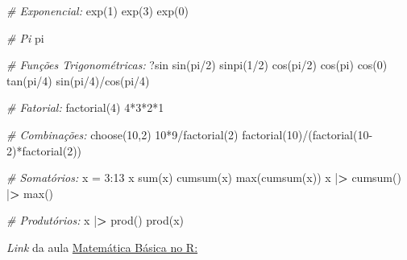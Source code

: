 \documentclass[
  brazilian,
]{book}
\newenvironment{Shaded}{\begin{snugshade}}{\end{snugshade}}
\newcommand{\CommentTok}[1]{\textcolor[rgb]{0.56,0.35,0.01}{\textit{#1}}}
\newcommand{\DecValTok}[1]{\textcolor[rgb]{0.00,0.00,0.81}{#1}}
\newcommand{\ErrorTok}[1]{\textcolor[rgb]{0.64,0.00,0.00}{\textbf{#1}}}
\newcommand{\FunctionTok}[1]{\textcolor[rgb]{0.00,0.00,0.00}{#1}}
\newcommand{\NormalTok}[1]{#1}
\newcommand{\OtherTok}[1]{\textcolor[rgb]{0.56,0.35,0.01}{#1}}
\newcommand{\SpecialCharTok}[1]{\textcolor[rgb]{0.00,0.00,0.00}{#1}}
\begin{document}
\begin{Shaded}
\begin{Highlighting}[]
\CommentTok{\# Exponencial:}
\FunctionTok{exp}\NormalTok{(}\DecValTok{1}\NormalTok{)}
\FunctionTok{exp}\NormalTok{(}\DecValTok{3}\NormalTok{)}
\FunctionTok{exp}\NormalTok{(}\DecValTok{0}\NormalTok{)}

\CommentTok{\# Pi}
\NormalTok{pi}

\CommentTok{\# Funções Trigonométricas:}
\NormalTok{?sin}
\FunctionTok{sin}\NormalTok{(pi}\SpecialCharTok{/}\DecValTok{2}\NormalTok{)}
\FunctionTok{sinpi}\NormalTok{(}\DecValTok{1}\SpecialCharTok{/}\DecValTok{2}\NormalTok{)}
\FunctionTok{cos}\NormalTok{(pi}\SpecialCharTok{/}\DecValTok{2}\NormalTok{)}
\FunctionTok{cos}\NormalTok{(pi)}
\FunctionTok{cos}\NormalTok{(}\DecValTok{0}\NormalTok{)}
\FunctionTok{tan}\NormalTok{(pi}\SpecialCharTok{/}\DecValTok{4}\NormalTok{)}
\FunctionTok{sin}\NormalTok{(pi}\SpecialCharTok{/}\DecValTok{4}\NormalTok{)}\SpecialCharTok{/}\FunctionTok{cos}\NormalTok{(pi}\SpecialCharTok{/}\DecValTok{4}\NormalTok{)}

\CommentTok{\# Fatorial:}
\FunctionTok{factorial}\NormalTok{(}\DecValTok{4}\NormalTok{)}
\DecValTok{4}\SpecialCharTok{*}\DecValTok{3}\SpecialCharTok{*}\DecValTok{2}\SpecialCharTok{*}\DecValTok{1}

\CommentTok{\# Combinações:}
\FunctionTok{choose}\NormalTok{(}\DecValTok{10}\NormalTok{,}\DecValTok{2}\NormalTok{)}
\DecValTok{10}\SpecialCharTok{*}\DecValTok{9}\SpecialCharTok{/}\FunctionTok{factorial}\NormalTok{(}\DecValTok{2}\NormalTok{)}
\FunctionTok{factorial}\NormalTok{(}\DecValTok{10}\NormalTok{)}\SpecialCharTok{/}\NormalTok{(}\FunctionTok{factorial}\NormalTok{(}\DecValTok{10{-}2}\NormalTok{)}\SpecialCharTok{*}\FunctionTok{factorial}\NormalTok{(}\DecValTok{2}\NormalTok{))}

\CommentTok{\# Somatórios:}
\NormalTok{x }\OtherTok{=} \DecValTok{3}\SpecialCharTok{:}\DecValTok{13}
\NormalTok{x}
\FunctionTok{sum}\NormalTok{(x)}
\FunctionTok{cumsum}\NormalTok{(x)}
\FunctionTok{max}\NormalTok{(}\FunctionTok{cumsum}\NormalTok{(x))}
\NormalTok{x }\SpecialCharTok{|}\ErrorTok{\textgreater{}} \FunctionTok{cumsum}\NormalTok{() }\SpecialCharTok{|}\ErrorTok{\textgreater{}} \FunctionTok{max}\NormalTok{()}

\CommentTok{\# Produtórios:}
\NormalTok{x }\SpecialCharTok{|}\ErrorTok{\textgreater{}} \FunctionTok{prod}\NormalTok{()}
\FunctionTok{prod}\NormalTok{(x)}
\end{Highlighting}
\end{Shaded}

\emph{Link} da aula \href{https://youtu.be/QDLqS3y5u7Q}{Matemática Básica no R:}
\end{document}
